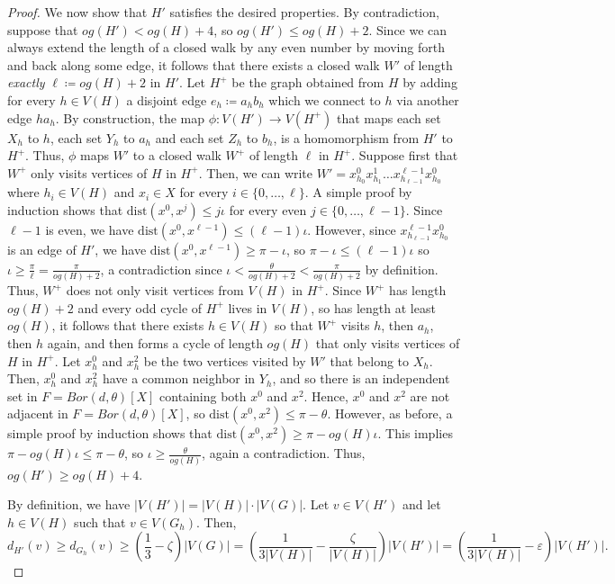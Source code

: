 \documentclass[10pt,a4paper]{amsart}
\newcommand{\dist}{\text{dist}}
\begin{document}
\begin{proof}
    We now show that $H'$ satisfies the desired properties.
    By contradiction, suppose that $og(H') < og(H) + 4$, so $og(H') \leq og(H) + 2$.
    Since we can always extend the length of a closed walk by any even number by moving forth and back along some edge, it follows that there exists a closed walk $W'$ of length \emph{exactly} $\ell \coloneqq og(H) + 2$ in $H'$.
    Let $H^+$ be the graph obtained from $H$ by adding for every $h \in V(H)$ a disjoint edge $e_h \coloneqq a_hb_h$ which we connect to $h$ via another edge $ha_h$. 
    By construction, the map $\phi : V(H') \to V(H^+)$ that maps each set $X_h$ to $h$, each set $Y_h$ to $a_h$ and each set $Z_h$ to $b_h$, is a homomorphism from $H'$ to $H^+$.
    Thus, $\phi$ maps $W'$ to a closed walk $W^+$ of length $\ell$ in $H^+$.
    Suppose first that $W^+$ only visits vertices of $H$ in $H^+$.
    Then, we can write $W' = x^0_{h_0}x^1_{h_1}\ldots x^{\ell-1}_{h_{\ell-1}}x^0_{h_0}$ where $h_i \in V(H)$ and $x_i \in X$ for every $i \in \{0, \ldots, \ell\}$.
    A simple proof by induction shows that $\dist(x^0, x^j) \leq j\iota$ for every even $j \in \{0, \ldots, \ell-1\}$.
    Since $\ell-1$ is even, we have $\dist(x^0, x^{\ell-1}) \leq (\ell-1)\iota$.
    However, since $x^{\ell-1}_{h_{\ell-1}}x^0_{h_0}$ is an edge of $H'$, we have $\dist(x^{0}, x^{\ell-1}) \geq \pi-\iota$, so $\pi-\iota \leq (\ell-1)\iota$ so $\iota \geq \frac{\pi}{\ell} = \frac{\pi}{og(H)+2}$, a contradiction since $\iota < \frac{\theta}{og(H)+2} < \frac{\pi}{og(H)+2}$ by definition.
    Thus, $W^+$ does not only visit vertices from $V(H)$ in $H^+$.
    Since $W^+$ has length $og(H)+2$ and every odd cycle of $H^+$ lives in $V(H)$, so has length at least $og(H)$, it follows that there exists $h \in V(H)$ so that $W^+$ visits $h$, then $a_h$, then $h$ again, and then forms a cycle of length $og(H)$ that only visits vertices of $H$ in $H^+$.
    Let $x^0_h$ and $x^2_h$ be the two vertices visited by $W'$ that belong to $X_h$.
    Then, $x^0_h$ and $x^2_h$ have a common neighbor in $Y_h$, and so there is an independent set in $F = Bor(d, \theta)[X]$ containing both $x^0$ and $x^2$. Hence, $x^0$ and $x^2$ are not adjacent in $F = Bor(d, \theta)[X]$, so $\dist(x^0, x^2) \leq \pi - \theta$.
    However, as before, a simple proof by induction shows that $\dist(x^0, x^2) \geq \pi - og(H)\iota$.
    This implies $\pi-og(H)\iota \leq \pi - \theta$, so $\iota \geq \frac{\theta}{og(H)}$, again a contradiction.
    Thus, $og(H') \geq og(H) + 4$.
    

    By definition, we have $|V(H')| = |V(H)| \cdot |V(G)|$.
    Let $v \in V(H')$ and let $h \in V(H)$ such that $v \in V(G_h)$.
    Then, \[d_{H'}(v) \geq d_{G_h}(v) \geq \left(\frac{1}{3} - \zeta\right)|V(G)| = \left(\frac{1}{3|V(H)|} - \frac{\zeta}{|V(H)|}\right)|V(H')| = \left(\frac{1}{3|V(H)|} - \varepsilon\right)|V(H')|.\]


\end{proof}
\end{document}
